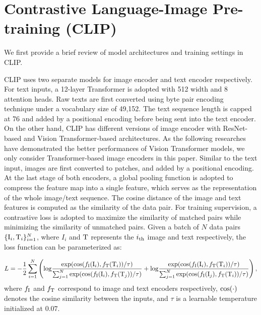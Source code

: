 \section{Contrastive Language-Image Pre-training (CLIP)}
We first provide a brief review of model architectures and training settings in CLIP.

CLIP uses two separate models for image encoder and text encoder respectively. For text inputs, a 12-layer Transformer is adopted with 512 width and 8 attention heads. Raw texts are first converted using byte pair encoding~\cite{bpe} technique under a vocabulary size of 49,152. The text sequence length is capped at 76 and added by a positional encoding before being sent into the text encoder. On the other hand, CLIP has different versions of image encoder with ResNet-based and Vision Transformer-based architectures. As the following researches have demonstrated the better performances of Vision Transformer models, we only consider Transformer-based image encoders in this paper. Similar to the text input, images are first converted to patches, and added by a positional encoding. At the last stage of both encoders, a global pooling function is adopted to compress the feature map into a single feature, which serves as the representation of the whole image/text sequence. The cosine distance of the image and text features is computed as the similarity of the data pair. For training supervision, a contrastive loss is adopted to maximize the similarity of matched pairs while minimizing the similarity of unmatched pairs. Given a batch of $N$ data pairs $\{{\rm I}_i, {\rm T}_i\}_{i=1}^N$, where $I_i$ and ${\rm T}$ represents the $i_{\rm th}$ image and text respectively, the loss function can be parameterized as:

\begin{equation}
    L = -\frac{1}{2}\sum_{i=1}^N \left({\rm log}\frac{{\rm exp}({\rm cos}(f_{\rm I}({\rm I}_i), f_{\rm T}({\rm T}_i))/\tau)}{\sum_{j=1}^N{\rm exp}({\rm cos}(f_{\rm I}({\rm I}_i), f_{\rm T}({\rm T}_j))/\tau)}+{\rm log}\frac{{\rm exp}({\rm cos}(f_{\rm I}({\rm I}_i), f_{\rm T}({\rm T}_i))/\tau)}{\sum_{j=1}^N{\rm exp}({\rm cos}(f_{\rm I}({\rm I}_j), f_{\rm T}({\rm T}_i))/\tau)}\right),
\end{equation}
where $f_{\rm I}$ and $f_{\rm T}$ correspond to image and text encoders respectively, ${\rm cos}(\cdot)$ denotes the cosine similarity between the inputs, and $\tau$ is a learnable temperature initialized at $0.07$.

